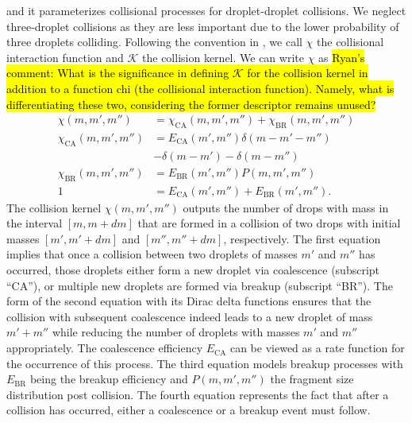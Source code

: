 \documentclass{report}
\begin{document}
and it parameterizes collisional processes for droplet-droplet collisions. We neglect three-droplet collisions as they are less important due to the lower probability of three droplets colliding. Following the convention in \citep{Beheng10}, we call $\chi$ the collisional interaction function and $\mathcal{K}$ the collision kernel. We can write $\chi$ as \hl{Ryan's comment: What is the significance in defining $\mathcal{K}$ for the collision kernel in addition to a function chi (the collisional interaction function). Namely, what is differentiating these two, considering the former descriptor remains unused?}
\begin{subequations}\label{eq:collisional_interaction_function}
\begin{align}
    \chi(m,m',m'') &= \chi_\mathrm{CA}(m,m',m'')  + \chi_\mathrm{BR}(m,m',m'')\\
    \chi_\mathrm{CA}(m,m',m'') &= E_\mathrm{CA}(m',m'')\delta(m-m'-m'')\\
    \nonumber &- \delta(m-m') - \delta(m-m'')\\
    \chi_\mathrm{BR}(m,m',m'') &= E_\mathrm{BR}(m',m'')P(m,m',m'')\\
    1 &= E_\mathrm{CA}(m',m'') + E_\mathrm{BR}(m',m'').
\end{align}
\end{subequations}
The collision kernel $\chi(m,m',m'')$ outputs the number of drops with mass in the interval $[m, m+dm]$ that are formed in a collision of two drops with initial masses $[m', m'+dm]$ and $[m'', m''+dm]$, respectively. The first equation implies that once a collision between two droplets of masses $m'$ and $m''$ has occurred, those droplets either form a new droplet via coalescence (subscript ``CA''), or multiple new droplets are formed via breakup (subscript ``BR''). The form of the second equation with its Dirac delta functions ensures that the collision with subsequent coalescence indeed leads to a new droplet of mass $m' + m''$ while reducing the number of droplets with masses $m'$ and $m''$ appropriately. The coalescence efficiency $E_\mathrm{CA}$ can be viewed as a rate function for the occurrence of this process. The third equation models breakup processes with $E_\mathrm{BR}$ being the breakup efficiency and $P(m, m', m'')$ the fragment size distribution post collision. The fourth equation represents the fact that after a collision has occurred, either a coalescence or a breakup event must follow. %
\end{document}
